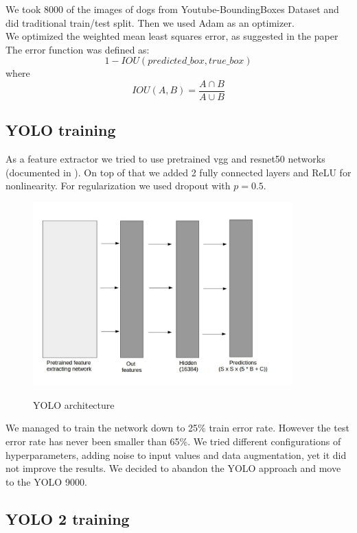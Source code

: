 \documentclass{article}
\begin{document}
We took 8000 of the images of dogs from Youtube-BoundingBoxes Dataset and did traditional train/test split. Then we used Adam as an optimizer. \\

We optimized the weighted mean least squares error, as suggested in the paper \cite{yolo} \\

The error function was defined as:
$$ 1 - IOU(predicted\_box, true\_box)$$
where
$$ IOU(A, B) = \frac{ A \cap B}{A \cup B} $$

\subsection*{YOLO training}
As a feature extractor we tried to use pretrained vgg and resnet50 networks (documented in \cite{models}). On top of that we added 2 fully connected layers and ReLU for nonlinearity. For regularization we used dropout with $p = 0.5$. 

\begin{figure}[H]
	\begin{center}
		\includegraphics[width=10cm]{yolo_arch.jpg}\\
		\centering
		\caption{YOLO architecture}
	\end{center}
\hfill

\end{figure}

We managed to train the network down to 25\% train error rate. However the test error rate has never been smaller than 65\%. We tried different configurations of hyperparameters, adding noise to input values and data augmentation, yet it did not improve the results. We decided to abandon the YOLO approach and move to the YOLO 9000.

\subsection*{YOLO 2 training}
\end{document}
